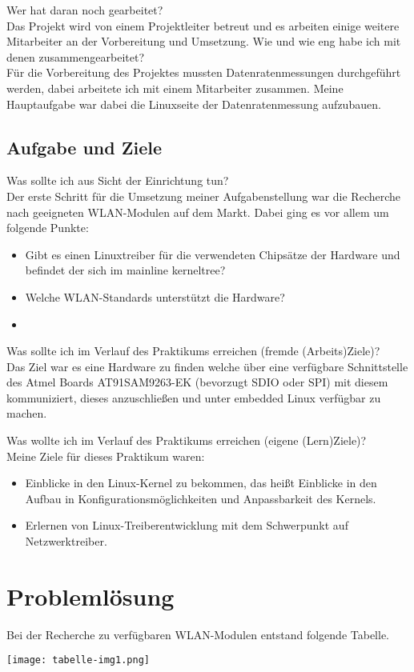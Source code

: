 \documentclass[pdftex,12pt,a4paper]{scrreprt}
\begin{document}
Wer hat daran noch gearbeitet?\\
Das Projekt wird von einem Projektleiter betreut und es arbeiten einige weitere Mitarbeiter an der Vorbereitung und Umsetzung.
Wie und wie eng habe ich mit denen zusammengearbeitet?\\
Für die Vorbereitung des Projektes mussten Datenratenmessungen durchgeführt werden, dabei arbeitete ich mit einem Mitarbeiter zusammen.
Meine Hauptaufgabe war dabei die Linuxseite der Datenratenmessung aufzubauen.
\subsection{Aufgabe und Ziele}
Was sollte ich aus Sicht der Einrichtung tun?\\
Der erste Schritt für die Umsetzung meiner Aufgabenstellung war die Recherche nach geeigneten WLAN-Modulen auf dem Markt.
Dabei ging es vor allem um folgende Punkte:\\
\begin{itemize}
 \item Gibt es einen Linuxtreiber für die verwendeten Chipsätze der Hardware und befindet der sich im mainline kerneltree?
 \item Welche WLAN-Standards unterstützt die Hardware?
 \item 
\end{itemize}

Was sollte ich im Verlauf des Praktikums erreichen (fremde (Arbeits)Ziele)?\\
Das Ziel war es eine Hardware zu finden welche über eine verfügbare Schnittstelle des Atmel Boards AT91SAM9263-EK (bevorzugt SDIO oder SPI) mit diesem kommuniziert, dieses anzuschließen und unter embedded Linux verfügbar zu machen.

Was wollte ich im Verlauf des Praktikums erreichen (eigene (Lern)Ziele)?\\
Meine Ziele für dieses Praktikum waren:
\begin{itemize}
 \item Einblicke in den Linux-Kernel zu bekommen, das heißt Einblicke in den Aufbau in Konfigurationsmöglichkeiten und Anpassbarkeit des Kernels.
 \item Erlernen von Linux-Treiberentwicklung mit dem Schwerpunkt auf Netzwerktreiber.

\end{itemize}

\section{Problemlösung}
Bei der Recherche zu verfügbaren WLAN-Modulen entstand folgende Tabelle.
\begin{center}
\texttt{[image: tabelle-img1.png]}
\end{center}
\end{document}
